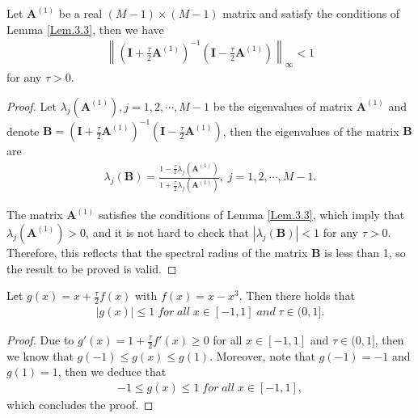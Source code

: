 \documentclass{siamart171218}
\numberwithin{theorem}{section}
\numberwithin{equation}{section}
\begin{document}
\begin{lemma}\label{Lem.3.6}
Let ${\mathbf{A}}^{(1)}$ be a real $(M-1)\times(M-1)$ matrix and
satisfy the conditions of Lemma \ref{Lem.3.3}, then we have
\begin{equation*}
\begin{aligned}
\displaystyle \left\|\left(
\mathbf{I}+\frac{\tau}{2}\mathbf{A}^{(1)}
\right)^{-1}\left(
\mathbf{I}-\frac{\tau}{2}\mathbf{A}^{(1)}
\right)\right\|_\infty< 1
\end{aligned}
\end{equation*}
for any $\tau>0$.
\end{lemma}

\begin{proof}
Let $\lambda_j \left(\mathbf{A}^{(1)}\right), j = 1, 2, \cdots, M -1$ be the
eigenvalues of matrix $\mathbf{A}^{(1)}$
and
denote $\mathbf{B}=\left(
\mathbf{I}+\frac{\tau}{2}\mathbf{A}^{(1)}
\right)^{-1}\left(
\mathbf{I}-\frac{\tau}{2}\mathbf{A}^{(1)}
\right)$, then the eigenvalues of the matrix $\mathbf{B}$ are
\begin{equation*}
\begin{aligned}
\displaystyle
\lambda_j \left(\mathbf{B}\right)=\frac{1-\frac{\tau}{2}\lambda_j \left(\mathbf{A}^{(1)}\right)}
{1+\frac{\tau}{2}\lambda_j \left(\mathbf{A}^{(1)}\right)},\;j = 1, 2, \cdots, M -1.
\end{aligned}
\end{equation*}

The matrix ${\mathbf{A}}^{(1)}$
satisfies the conditions of Lemma \ref{Lem.3.3}, which imply that
$\lambda_j \left(\mathbf{A}^{(1)}\right)>0$, and
it is not hard to check that $\left|\lambda_j \left(\mathbf{B}\right)\right|<1$
for any $\tau>0$.
Therefore, this reflects that the spectral radius of the matrix $\mathbf{B}$ is less than 1,
so the result to be proved is valid.
\end{proof}

\begin{lemma}\label{Lem.3.7}
Let
$ g(x)=x+\frac{\tau}{2}f(x)$ with $f(x)=x-x^3$.
Then there holds that
\begin{equation*}
\begin{aligned}
\displaystyle \left|g(x)\right|\leq1\;for\; all\; x\in[-1,1] \;and \;\tau\in(0,1].
\end{aligned}
\end{equation*}
\end{lemma}
\begin{proof}
Due to  $g'(x)=1+\frac{\tau}{2}f'(x)\geq0$ for all $x\in[-1,1]$ and $\tau\in(0,1]$,
 then we know that $g(-1)\leq g(x)\leq g(1)$. Moreover, note that $g(-1)=-1$ and
$g(1)=1$, then we deduce that
\begin{equation*}
\begin{aligned}
-1\leq g(x)\leq 1 \;for \;all\; x\in[-1,1],
\end{aligned}
\end{equation*}
which concludes the proof.
\end{proof}
\end{document}
